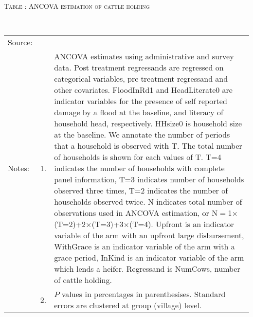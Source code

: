 \hspace{-1cm}\begin{minipage}[t]{14cm}
\hfil\textsc{\normalsize Table \thetable: ANCOVA estimation of cattle holding\label{tab ANCOVA cow}}\\
\setlength{\tabcolsep}{1pt}
\setlength{\baselineskip}{8pt}
\renewcommand{\arraystretch}{.55}
\hfil{}\\
\renewcommand{\arraystretch}{.8}
\setlength{\tabcolsep}{1pt}
\begin{tabular}{>{\hfill\scriptsize}p{1cm}<{}>{\hfill\scriptsize}p{.25cm}<{}>{\scriptsize}p{12cm}<{\hfill}}
Source:& \multicolumn{2}{l}{\scriptsize Estimated with GUK administrative and survey data.}\\
Notes: & 1. & ANCOVA estimates using administrative and survey data. Post treatment regressands are regressed on categorical variables, pre-treatment regressand and other covariates. \textsf{FloodInRd1} and \textsf{HeadLiterate0} are indicator variables for the presence of self reported damage by a flood at the baseline, and literacy of household head, respectively. \textsf{HHsize0} is household size at the baseline. We annotate the number of periods that a household is observed with \textsf{T}. The total number of households is shown for each values of \textsf{T}. \textsf{T=4} indicates the number of households with complete panel information, \textsf{T=3} indicates number of households observed three times, \textsf{T=2} indicates the number of households observed twice. \textsf{N} indicates total number of observations used in ANCOVA estimation, or \textsf{N$=$1$\times$(T=2)+2$\times$(T=3)+3$\times$(T=4)}.  \textsf{Upfront} is an indicator variable of the arm with an upfront large disbursement, \textsf{WithGrace} is an indicator variable of the arm with a grace period, \textsf{InKind} is an indicator variable of the arm which lends a heifer. Regressand is \textsf{NumCows}, number of cattle holding. \\
& 2. & $P$ values in percentages in parenthesises. Standard errors are clustered at group (village) level.
\end{tabular}
\end{minipage}

